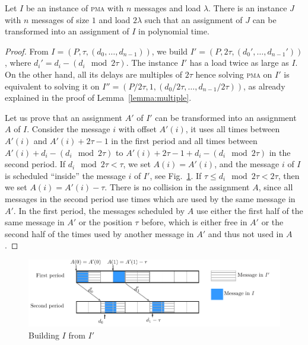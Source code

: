 \documentclass[a4paper,UKenglish,cleveref, autoref, thm-restate]{lipics-v2019}
\newcommand\pma{\textsc{pma}\xspace}
\begin{document}
\begin{theorem}\label{th:double_load}
Let $I$ be an instance of \pma with $n$ messages and load $\lambda$. There is an instance $J$ with $n$ messages of size $1$
and load $2\lambda$ such that an assignment of $J$ can be transformed into an assignment of $I$ in polynomial time.
\end{theorem}
\begin{proof}
From $I = (P,\tau,(d_{0},\dots,d_{n-1}))$, we build $I' = (P, 2\tau, (d_{0}',\dots,d_{n-1}'))$, where $d_i' = d_{i} - (d_{i} \mod 2\tau)$. The instance $I'$ has a load twice as large as $I$.
On the other hand, all its delays are multiples of $2\tau$ hence solving \pma on $I'$ is equivalent to solving it on $I'' = (P/2\tau, 1,(d_{0}/ 2\tau,\dots,d_{n-1} /2\tau))$, as already explained in the proof of Lemma~\ref{lemma:multiple}. 

Let us prove that an assignment $A'$ of $I'$ can be transformed into an assignment $A$ of $I$. 
Consider the message $i$ with offset $A'(i)$, it uses all times between $A'(i)$ and $A'(i) + 2\tau -1$ in the first period and all times between $A'(i) + d_{i} - (d_{i} \mod 2\tau)$ to $A'(i) + 2\tau -1+ d_{i} - (d_{i} \mod 2\tau)$ in the second period. 
If $d_{i} \mod 2\tau < \tau $, we set $A(i) = A'(i)$, and the message $i$ of $I$ is scheduled ``inside'' the 
message $i$ of $I'$, see Fig.~\ref{fig:transf_2tau}. If $\tau \leq d_{i} \mod 2\tau < 2\tau$, then we set 
$A(i) = A'(i) - \tau$. There is no collision in the assignment $A$, since all messages in the second period use
times which are used by the same message in $A'$. In the first period, the messages scheduled by $A$ use either the first
half of the same message in $A'$ or the position $\tau$ before, which is either free in $A'$ or the second half of the times used by another message in $A'$ and thus not used in $A$. 
\end{proof}
\begin{figure}[h]
\begin{center}

\includegraphics[scale=0.7]{transfo2tau}
\end{center}
\caption{Building $I$ from $I'$}
\label{fig:transf_2tau}
\end{figure}
\end{document}
